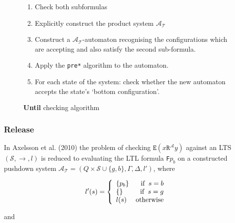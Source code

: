 \documentclass[11pt]{article}
\theoremstyle{definition}
\begin{document}
\begin{figure}[h!]
\caption{\textbf{Until} checking algorithm}
\begin{enumerate}
\item{Check both subformulas}
\item{Explicitly construct the product system $\mathcal{A_T}$}
\item{Construct a $\mathcal{A_T}$-automaton recognising the configurations which are accepting and also satisfy the second sub-formula.}

\item{Apply the \texttt{pre*} algorithm to the automaton.}

\item{For each state of the system:
   check whether the new automaton accepts the state's `bottom configuration'.}
   \end{enumerate}
\end{figure}

\subsubsection{Release}


In Axelsson et al. (2010) the problem of checking
$\texttt{E}(x\texttt{R}^\mathcal{A}y)$ against an LTS $(\mathcal{S}, \rightarrow, l)$ 
is reduced to evaluating the LTL formula
\texttt{F}$p_b$ on a constructed pushdown system $\mathcal{A}_\mathcal{T} = (Q
\times \mathcal{S} \cup \{g, b\}, \Gamma, \Delta, l')$, where 

\begin{displaymath}
   l'(s) =  \left\{
     \begin{array}{lr}
       \{p_b\} & \text{if} \hspace{2mm} s = b\\
       \{\} & \text{if}  \hspace{2mm} s = g \\
       l(s) & \text{otherwise}
     \end{array}
   \right.
\end{displaymath}
   
and 
\end{document}
